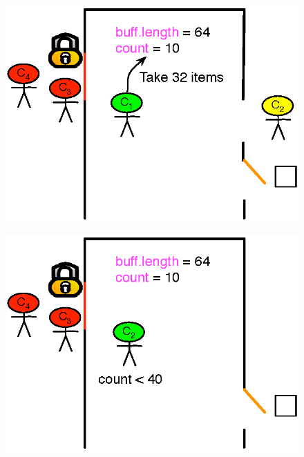 \documentclass[mathserif,14pt,xcolor=table]{beamer}
\begin{document}
\begin{frame}
     {
        \begin{figure}[ht!]
            \centering
            \includegraphics[scale=0.75]{fig/sig_exp_3.eps}
        \end{figure}
    }
     {
        \begin{figure}[ht!]
            \centering
            \includegraphics[scale=0.75]{fig/sig_exp_4.eps}
        \end{figure}
    }
     {
        \begin{figure}[ht!]
            \centering

\end{figure}}
\end{frame}
\end{document}
